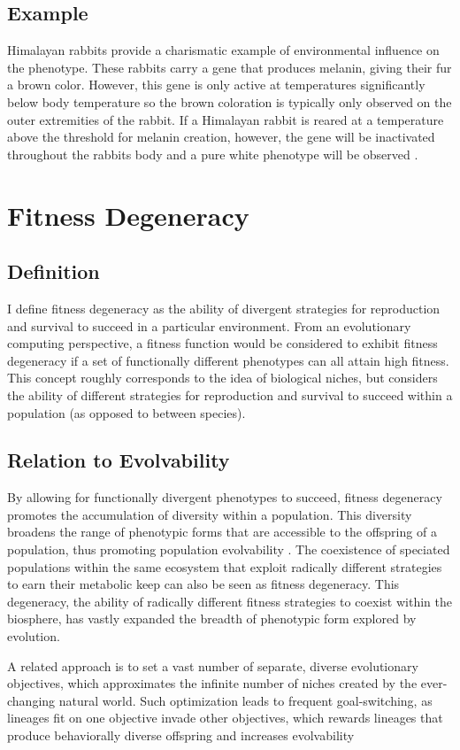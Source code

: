 \subsection{Example}

Himalayan rabbits provide a charismatic example of environmental influence on the phenotype. These rabbits carry a gene that produces melanin, giving their fur a brown color. However, this gene is only active at temperatures significantly below body temperature so the brown coloration is typically only observed on the outer extremities of the rabbit. If a Himalayan rabbit is reared at a temperature above the threshold for melanin creation, however, the gene will be inactivated throughout the rabbits body and a pure white phenotype will be observed \cite{Lobo2008EnvironmentalExpresssion}.

\section{Fitness Degeneracy}

\subsection{Definition}
I define fitness degeneracy as the ability of divergent strategies for reproduction and survival to succeed in a particular environment.
From an evolutionary computing perspective, a fitness function would be considered to exhibit fitness degeneracy if a set of functionally different phenotypes can all attain high fitness.
This concept roughly corresponds to the idea of biological niches, but considers the ability of different strategies for reproduction and survival to succeed within a population (as opposed to between species).

\subsection{Relation to Evolvability}
By allowing for functionally divergent phenotypes to succeed, fitness degeneracy promotes the accumulation of diversity within a population. This diversity broadens the range of phenotypic forms that are accessible to the offspring of a population, thus promoting population evolvability . The coexistence of speciated populations within the same ecosystem that exploit radically different strategies to earn their metabolic keep
can also be seen as fitness degeneracy. This degeneracy, the ability of radically different fitness strategies to coexist within the biosphere, has vastly expanded the breadth of phenotypic form explored by evolution.
\begin{displayquote}
 A related approach is to set a vast number of separate, diverse evolutionary objectives, which approximates the infinite number of niches created by the ever-changing natural world.  Such optimization leads to frequent goal-switching, as lineages fit on one objective invade other objectives, which rewards lineages that produce behaviorally diverse offspring and increases evolvability
\cite{Mengistu2016EvolvabilityIt}
\end{displayquote}

